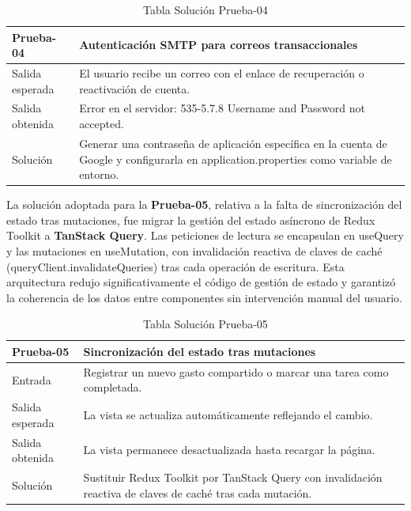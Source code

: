 \begin{table}[H]
\centering
\begin{tabular}{|p{}|p{}|}
\hline
\textbf{Prueba-04} & \textbf{Autenticación SMTP para correos transaccionales} \\ \hline
Salida esperada & El usuario recibe un correo con el enlace de recuperación o reactivación de cuenta. \\ \hline
Salida obtenida & Error en el servidor: 535-5.7.8 Username and Password not accepted. \\ \hline
Solución & Generar una contraseña de aplicación específica en la cuenta de Google y configurarla en application.properties como variable de entorno. \\ \hline
\end{tabular}
\caption{Tabla Solución Prueba-04}
\label{tab:sol_prueba04}
\end{table}

La solución adoptada para la \textbf{Prueba-05}, relativa a la falta de sincronización del estado tras mutaciones, fue migrar la gestión del estado asíncrono de Redux Toolkit a \textbf{TanStack Query}. Las peticiones de lectura se encapsulan en useQuery y las mutaciones en useMutation, con invalidación reactiva de claves de caché (queryClient.invalidateQueries) tras cada operación de escritura. Esta arquitectura redujo significativamente el código de gestión de estado y garantizó la coherencia de los datos entre componentes sin intervención manual del usuario.

\begin{table}[H]
\centering
\begin{tabular}{|p{}|p{}|}
\hline
\textbf{Prueba-05} & \textbf{Sincronización del estado tras mutaciones} \\ \hline
Entrada & Registrar un nuevo gasto compartido o marcar una tarea como completada. \\ \hline
Salida esperada & La vista se actualiza automáticamente reflejando el cambio. \\ \hline
Salida obtenida & La vista permanece desactualizada hasta recargar la página. \\ \hline
Solución & Sustituir Redux Toolkit por TanStack Query con invalidación reactiva de claves de caché tras cada mutación. \\ \hline
\end{tabular}
\caption{Tabla Solución Prueba-05}
\label{tab:sol_prueba05}
\end{table}

